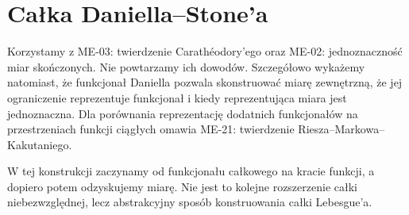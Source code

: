 \providecommand{\atlasref}[2]{#2}
\chapter{Całka Daniella--Stone'a}
\label{ch:daniell-stone-32}

Korzystamy z \atlasref{ME-03::thm:caratheodory}{ME-03: twierdzenie Carathéodory'ego}
oraz \atlasref{ME-02::thm:uniqueness-finite}{ME-02: jednoznaczność miar skończonych}.
Nie powtarzamy ich dowodów. Szczegółowo wykażemy natomiast,
że funkcjonał Daniella pozwala skonstruować miarę zewnętrzną,
że jej ograniczenie reprezentuje funkcjonał i kiedy
reprezentująca miara jest jednoznaczna.
Dla porównania reprezentację dodatnich funkcjonałów
na przestrzeniach funkcji ciągłych omawia
\atlasref{ME-21::thm:riesz-positive-21}{ME-21: twierdzenie Riesza--Markowa--Kakutaniego}.

W tej konstrukcji zaczynamy od funkcjonału całkowego na kracie funkcji, a dopiero potem odzyskujemy miarę. Nie jest to kolejne rozszerzenie całki niebezwzględnej, lecz abstrakcyjny sposób konstruowania całki Lebesgue'a.
